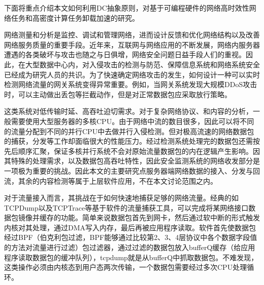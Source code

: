 下面将重点介绍本文如何利用DC抽象原则，对基于可编程硬件的网络高时效性网络任务和高密度计算任务卸载加速的研究。




网络测量和分析是监控、调试和管理网络，进而设计反馈和优化网络结构以及改善网络服务质量的重要手段。近年来，互联网与网络应用的不断发展，网络内服务器遭遇的各类破坏与攻击也随之与日俱增，网络安全问题日益手段人们的重视。因此，在大型数据中心内，对入侵攻击的检测与防范、保障信息系统和网络系统安全已经成为研究人员的共识。为了快速确定网络攻击的发生，如何设计一种可以实时检测网络流量的网关系统变得异常重要。例如，当网关系统发现大规模DDoS攻击时，可以主动做出丢包等拦截动作，但是对正常数据包应采取放行策略。

这类系统对低传输时延、高吞吐迫切需求。对于复杂网络协议、和内容的分析，一般需要使用大型服务器的多核CPU。由于网络中流的数目很多，因此可以将不同的流量分配到不同的并行CPU中去做并行入侵检测。但对极高流速的网络数据包的捕获，分发等工作却面临很大的性能压力。经过检测系统处理完的数据包还需按先后顺序汇聚，保证多核并行系统不会对原始流量数据包的内在逻辑产生影响。因其特殊的处理需求，以及数据包高吞吐特性，因此安全监测系统的网络收发部分是一项极为重要的挑战。因此本文的主要研究点服务器端网络数据的接入、分发与回流，其余的内容检测等属于上层软件应用，不在本文讨论范围之内。






对于流量接入而言，其挑战在于如何快速地捕获足够的网络流量。经典的如TCPDump以及TCPTrace等基于软件的流量捕获工具，可以完成将某网络接口数据包镜像并缓存的功能。简单来说数据包首先到网卡，然后通过软中断的形式触发内核对其处理，通过DMA写入内存，最后再被应用程序读取。软件首先使数据包经过BPF（伯克利包过滤，BPF能够通过比较第2、3、4层协议中各个数据字段值的方法对流量进行过滤）包过滤器，通过过滤的数据包放入bufferQ缓存（给应用程序读取数据包的缓冲队列），tcpdump就是从bufferQ中抓取数据包。不难发现，这类操作必须由内核态到用户态两次传输，一个数据包需要经过多次CPU处理循环。

